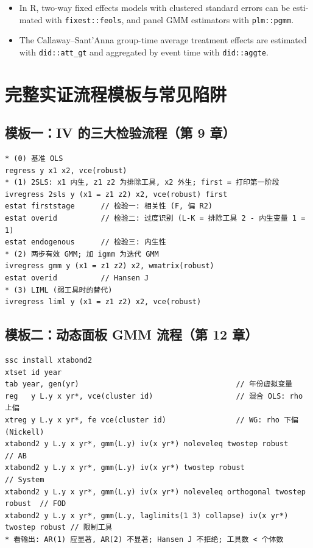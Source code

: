 \begin{english}
\begin{itemize}
  \item In R, two-way fixed effects models with clustered standard errors can be estimated with \texttt{fixest::feols}, and panel GMM estimators with \texttt{plm::pgmm}.
  \item The Callaway--Sant'Anna group-time average treatment effects are estimated with \texttt{did::att\_gt} and aggregated by event time with \texttt{did::aggte}.
\end{itemize}
\end{english}

\section{完整实证流程模板与常见陷阱}\label{sec:UappB-templates}

\subsection{模板一：IV 的三大检验流程（第 9 章）}

\begin{lstlisting}
* (0) 基准 OLS
regress y x1 x2, vce(robust)
* (1) 2SLS: x1 内生, z1 z2 为排除工具, x2 外生; first = 打印第一阶段
ivregress 2sls y (x1 = z1 z2) x2, vce(robust) first
estat firststage      // 检验一: 相关性 (F, 偏 R2)
estat overid          // 检验二: 过度识别 (L-K = 排除工具 2 - 内生变量 1 = 1)
estat endogenous      // 检验三: 内生性
* (2) 两步有效 GMM; 加 igmm 为迭代 GMM
ivregress gmm y (x1 = z1 z2) x2, wmatrix(robust)
estat overid          // Hansen J
* (3) LIML (弱工具时的替代)
ivregress liml y (x1 = z1 z2) x2, vce(robust)
\end{lstlisting}

\subsection{模板二：动态面板 GMM 流程（第 12 章）}

\begin{lstlisting}
ssc install xtabond2
xtset id year
tab year, gen(yr)                                    // 年份虚拟变量
reg   y L.y x yr*, vce(cluster id)                   // 混合 OLS: rho 上偏
xtreg y L.y x yr*, fe vce(cluster id)                // WG: rho 下偏 (Nickell)
xtabond2 y L.y x yr*, gmm(L.y) iv(x yr*) noleveleq twostep robust             // AB
xtabond2 y L.y x yr*, gmm(L.y) iv(x yr*) twostep robust                       // System
xtabond2 y L.y x yr*, gmm(L.y) iv(x yr*) noleveleq orthogonal twostep robust  // FOD
xtabond2 y L.y x yr*, gmm(L.y, laglimits(1 3) collapse) iv(x yr*) twostep robust // 限制工具
* 看输出: AR(1) 应显著, AR(2) 不显著; Hansen J 不拒绝; 工具数 < 个体数
\end{lstlisting}

